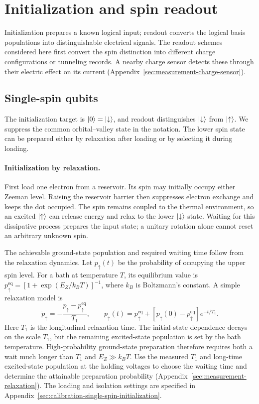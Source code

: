 \section{Initialization and spin readout}
\label{sec:initialization-readout}

Initialization prepares a known logical input; readout converts the
logical basis populations into distinguishable electrical signals.
The readout schemes considered here first convert the spin
distinction into different charge configurations or tunneling
records. A nearby charge sensor detects these through their
electric effect on its current (Appendix~\ref{sec:measurement-charge-sensor}).

\subsection{Single-spin qubits}
\label{sec:single-spin-spam}
\label{sec:spin-initialization}

The initialization target is $\lvert 0\rangle=\lvert \downarrow\rangle$, and readout
distinguishes $\lvert \downarrow\rangle$ from $\lvert \uparrow\rangle$.
We suppress the common orbital--valley state in the notation.
The lower spin state can be prepared either by relaxation after
loading or by selecting it during loading.

\paragraph{Initialization by relaxation.}
First load one electron from a reservoir. Its spin may initially
occupy either Zeeman level. Raising the reservoir barrier then
suppresses electron exchange and keeps the dot occupied.
The spin remains coupled to the thermal environment, so an excited
$\lvert \uparrow\rangle$ can release energy and relax to the lower
$\lvert \downarrow\rangle$ state. Waiting for this dissipative process
prepares the input state; a unitary rotation alone cannot reset an
arbitrary unknown spin.

The achievable ground-state population and required waiting time
follow from the relaxation dynamics. Let $p_\uparrow(t)$ be the
probability of occupying the upper spin level.
For a bath at temperature $T$, its equilibrium value is
$p_\uparrow^{\mathrm{eq}}=[1+\exp(E_Z/k_BT)]^{-1}$, where $k_B$
is Boltzmann's constant. A simple relaxation model is
\begin{equation}
  \dot p_\uparrow=-\frac{p_\uparrow-p_\uparrow^{\mathrm{eq}}}{T_1},
  \qquad
  p_\uparrow(t)=p_\uparrow^{\mathrm{eq}}
       +[p_\uparrow(0)-p_\uparrow^{\mathrm{eq}}]e^{-t/T_1}.
  \label{eq:thermal-spin-initialization}
\end{equation}
Here $T_1$ is the longitudinal relaxation time.
The initial-state dependence decays on the scale $T_1$, but the
remaining excited-state population is set by the bath temperature.
High-probability ground-state preparation therefore requires both
a wait much longer than $T_1$ and $E_Z\gg k_BT$.
Use the measured $T_1$ and long-time excited-state population at the
holding voltages to choose the waiting time and determine the
attainable preparation probability
(Appendix~\ref{sec:measurement-relaxation}). The loading and isolation
settings are specified in
Appendix~\ref{sec:calibration-single-spin-initialization}.

